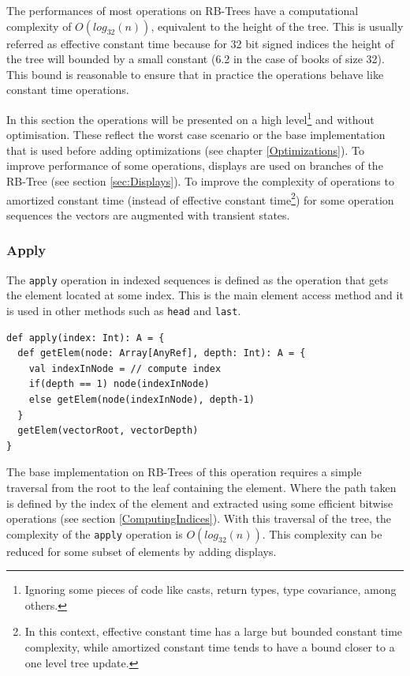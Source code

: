 The performances of most operations on RB-Trees have a computational complexity of $O(log_{32}(n))$, equivalent to the height of the tree. This is usually referred as effective constant time because for 32 bit signed indices the height of the tree will bounded by a small constant (6.2 in the case of books of size 32). This bound is reasonable to ensure that in practice the operations behave like constant time operations.  
 
In this section the operations will be presented on a high level\footnote{Ignoring some pieces of code like casts, return types, type covariance, among others.} and without optimisation. These reflect the worst case scenario or the base implementation that is used before adding optimizations (see chapter \ref{Optimizations}). To improve performance of some operations, displays are used on branches of the RB-Tree (see section \ref{sec:Displays}). To improve the complexity of operations to amortized constant time (instead of effective constant time\footnote{In this context, effective constant time has a large but bounded constant time complexity, while amortized constant time tends to have a bound closer to a one level tree update.}) for some operation sequences the vectors are augmented with transient states.


\subsubsection{Apply}
The \texttt{apply} operation in indexed sequences is defined as the operation that gets the element located at some index. This is the main element access method and it is used in other methods such as \texttt{head} and \texttt{last}.

\begin{lstlisting}[frame=single]
def apply(index: Int): A = {
  def getElem(node: Array[AnyRef], depth: Int): A = {
    val indexInNode = // compute index
    if(depth == 1) node(indexInNode)
    else getElem(node(indexInNode), depth-1) 
  }
  getElem(vectorRoot, vectorDepth)
}
\end{lstlisting}

The base implementation on RB-Trees of this operation requires a simple traversal from the root to the leaf containing the element. Where the path taken is defined by the index of the element and extracted using some efficient bitwise operations (see section \ref{ComputingIndices}). With this traversal of the tree, the complexity of the \texttt{apply} operation is $O(log_{32}(n))$. This complexity can be reduced for some subset of elements by adding displays.


